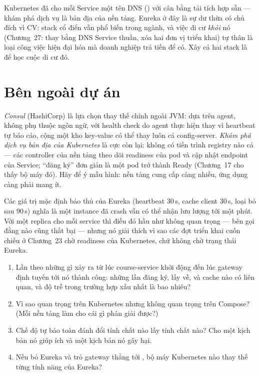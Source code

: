 \begin{decision}
Kubernetes đã cho mỗi Service một tên DNS ()
với cân bằng tải tích hợp sẵn --- khám phá dịch vụ là bản địa của nền
tảng. Eureka ở đây là sự dư thừa có chủ đích vì CV: stack cổ điển vẫn
phổ biến trong ngành, và việc di cư \emph{khỏi} nó (Chương~27: thay
 bằng DNS Service thuần, xóa hai đơn vị triển khai) tự thân
là loại công việc hiện đại hóa mà doanh nghiệp trả tiền để có. Xây cả hai
stack là để học cuộc di cư đó.
\end{decision}

\section{Bên ngoài dự án}

\emph{Consul} (HashiCorp) là lựa chọn thay thế chính ngoài JVM: dựa trên
agent, không phụ thuộc ngôn ngữ, với health check do agent thực hiện thay
vì heartbeat tự báo cáo, cộng một kho key-value có thể thay luôn cả
config-server. \emph{Khám phá dịch vụ bản địa của Kubernetes} là cực còn
lại: không có tiến trình registry nào cả --- các controller của nền tảng
theo dõi readiness của pod và cập nhật endpoint của Service; ``đăng ký''
đơn giản là một pod trở thành Ready (Chương~17 cho thấy bộ máy đó). Hãy
để ý mẫu hình: nền tảng cung cấp càng nhiều, ứng dụng càng phải mang ít.

\begin{hardware}
Các giá trị mặc định bảo thủ của Eureka (heartbeat 30\,s, cache client
30\,s, loại bỏ sau 90\,s) nghĩa là một instance đã crash vẫn có thể nhận
lưu lượng tới một phút. Với một replica cho mỗi service thì điều đó hầu
như không quan trọng --- bên gọi đằng nào cũng thất bại --- nhưng nó giải
thích vì sao các đợt triển khai cuốn chiếu ở Chương~23 chờ readiness của
Kubernetes, chứ không chờ trạng thái Eureka.
\end{hardware}

\begin{quiz}
\begin{enumerate}
  \item Lần theo những gì xảy ra từ lúc course-service khởi động đến lúc
  gateway định tuyến tới nó thành công: những lần đăng ký, lấy về, và
  cache nào có liên quan, và độ trễ trong trường hợp xấu nhất là bao
  nhiêu?
  \item Vì sao  quan trọng trên Kubernetes nhưng
  không quan trọng trên Compose? (Mỗi nền tảng làm cho cái gì phân giải
  được?)
  \item Chế độ tự bảo toàn đánh đổi tính chất nào lấy tính chất nào? Cho
  một kịch bản nó giúp ích và một kịch bản nó gây hại.
  \item Nếu bỏ Eureka và trỏ gateway thẳng tới
  , bộ máy Kubernetes nào thay thế từng
  tính năng của Eureka?
\end{enumerate}
\end{quiz}
